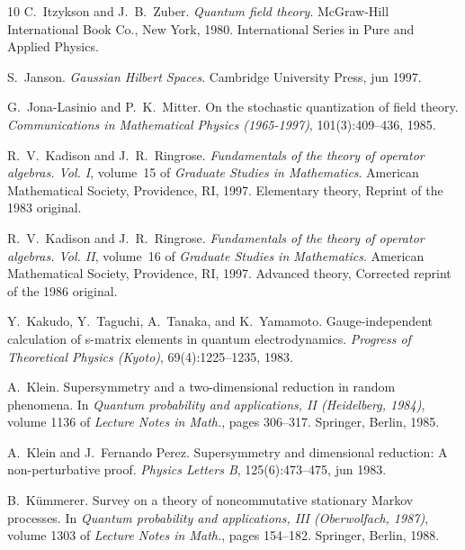 \documentclass{article}
\newcommand{\tmtextit}[1]{{\itshape{#1}}}
\begin{document}
\begin{thebibliography}{10}
  C.~Itzykson  and  J.~B.~Zuber.
  {\newblock}\tmtextit{Quantum field theory}. {\newblock}McGraw-Hill
  International Book Co., New York, 1980. {\newblock}International Series in
  Pure and Applied Physics.{\newblock}
  
  S.~Janson. {\newblock}\tmtextit{Gaussian
  Hilbert Spaces}. {\newblock}Cambridge University Press, jun 1997.{\newblock}
  
  G.~Jona-Lasinio  and 
  P.~K.~Mitter. {\newblock}On the stochastic quantization of field theory.
  {\newblock}\tmtextit{Communications in Mathematical Physics (1965-1997)},
  101(3):409--436, 1985.{\newblock}
  
  R.~V.~Kadison  and  J.~R.~Ringrose.
  {\newblock}\tmtextit{Fundamentals of the theory of operator algebras. Vol.
  I},  volume~15  of \tmtextit{Graduate Studies in Mathematics}.
  {\newblock}American Mathematical Society, Providence, RI, 1997.
  {\newblock}Elementary theory, Reprint of the 1983 original.{\newblock}
  
  R.~V.~Kadison  and  J.~R.~Ringrose.
  {\newblock}\tmtextit{Fundamentals of the theory of operator algebras. Vol.
  II},  volume~16  of \tmtextit{Graduate Studies in Mathematics}.
  {\newblock}American Mathematical Society, Providence, RI, 1997.
  {\newblock}Advanced theory, Corrected reprint of the 1986
  original.{\newblock}
  
  Y.~Kakudo, Y.~Taguchi, A.~Tanaka, and 
  K.~Yamamoto. {\newblock}Gauge-independent calculation of s-matrix elements
  in quantum electrodynamics. {\newblock}\tmtextit{Progress of Theoretical
  Physics (Kyoto)}, 69(4):1225--1235, 1983.{\newblock}
  
  A.~Klein. {\newblock}Supersymmetry and
  a two-dimensional reduction in random phenomena. {\newblock}In
  \tmtextit{Quantum probability and applications, II (Heidelberg, 1984)}, 
  volume  1136  of \tmtextit{Lecture Notes in Math.},  pages  306--317.
  Springer, Berlin, 1985.{\newblock}
  
  A.~Klein  and  J.~Fernando Perez.
  {\newblock}Supersymmetry and dimensional reduction: A non-perturbative
  proof. {\newblock}\tmtextit{Physics Letters B}, 125(6):473--475, jun
  1983.{\newblock}
  
  B.~K{\"u}mmerer. {\newblock}Survey on a theory of
  noncommutative stationary Markov processes. {\newblock}In \tmtextit{Quantum
  probability and applications, III (Oberwolfach, 1987)},  volume  1303  of
  \tmtextit{Lecture Notes in Math.},  pages  154--182. Springer, Berlin,
  1988.{\newblock}
  

\end{thebibliography}
\end{document}
